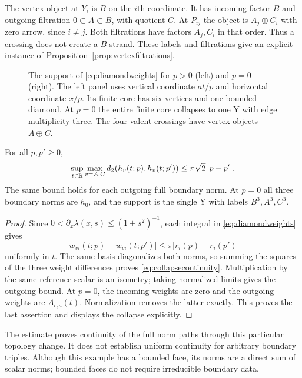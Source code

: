 The vertex object at $Y_i$ is $B$ on the $i$th coordinate.
It has incoming factor $B$ and outgoing filtration
$0\subset A\subset B$, with quotient $C$.
At $P_{ij}$ the object is $A_j\oplus C_i$ with zero arrow,
since $i\ne j$. Both filtrations have factors $A_j,C_i$
in that order. Thus a crossing does not create a $B$ strand.
These labels and filtrations give an explicit instance of
Proposition~\ref{prop:vertexfiltrations}.

\begin{figure}[t]
\centering

\caption{The support of \eqref{eq:diamondweights} for $p>0$
(left) and $p=0$ (right). The left panel uses vertical coordinate
$a t/p$ and horizontal coordinate $x/p$. Its finite core has six
vertices and one bounded diamond. At $p=0$ the entire finite core collapses to
one Y with edge multiplicity three. The four-valent crossings have
vertex objects $A\oplus C$.}
\label{fig:diamondcollapse}
\end{figure}

\begin{proposition}\label{prop:collapsecontinuity}
For all $p,p'\ge0$,
\begin{equation}\label{eq:collapsecontinuity}
 \sup_{t\in\mathbb R}\max_{v=A,C}
 d_2(h_v(t;p),h_v(t;p'))\le\pi\sqrt2\,|p-p'|.
\end{equation}
The same bound holds for each outgoing full boundary norm.
At $p=0$ all three boundary norms are $h_0$, and the support
is the single Y with labels $B^3,A^3,C^3$.
\end{proposition}

\begin{proof}
Since $0<\partial_x\lambda(x,s)\le(1+s^2)^{-1}$,
each integral in \eqref{eq:diamondweights} gives
\[
 |w_{vi}(t;p)-w_{vi}(t;p')|
       \le\pi|r_i(p)-r_i(p')|
\]
uniformly in $t$. The same basis diagonalizes both norms, so
summing the squares of the three weight differences proves
\eqref{eq:collapsecontinuity}. Multiplication by the same
reference scalar is an isometry; taking normalized limits
gives the outgoing bound. At $p=0$, the incoming weights are
zero and the outgoing weights are $A_{\epsilon_va}(t)$.
Normalization removes the latter exactly. This proves the
last assertion and displays the collapse explicitly.
\end{proof}

The estimate proves continuity of the full norm paths through
this particular topology change. It does not establish uniform
continuity for arbitrary boundary triples. Although this example
has a bounded face, its norms are a direct sum of scalar norms;
bounded faces do not require irreducible boundary data.

